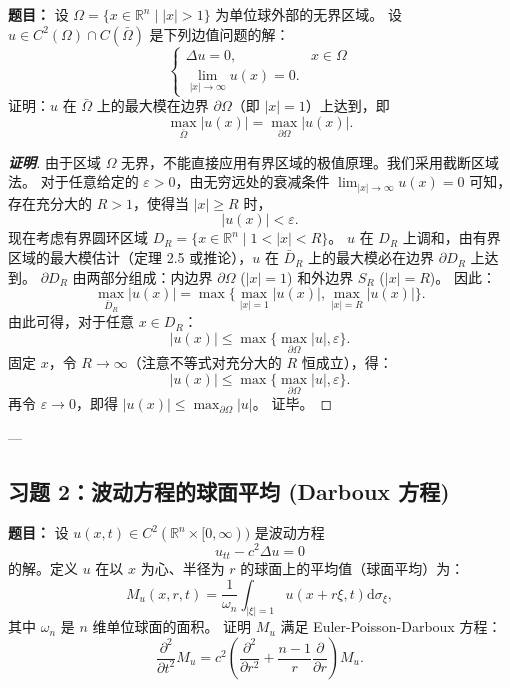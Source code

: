 \documentclass[12pt,a4paper]{ctexart}
\begin{document}
	\textbf{题目：}
	设 $\Omega = \{ x \in \mathbb{R}^n \mid |x| > 1 \}$ 为单位球外部的无界区域。
	设 $u \in C^2(\Omega) \cap C(\bar{\Omega})$ 是下列边值问题的解：
	\begin{equation}
		\begin{cases}
			\Delta u = 0, & x \in \Omega \\
			\lim_{|x| \to \infty} u(x) = 0. &
		\end{cases}
	\end{equation}
	证明：$u$ 在 $\bar{\Omega}$ 上的最大模在边界 $\partial \Omega$（即 $|x|=1$）上达到，即
	\begin{equation}
		\max_{\bar{\Omega}} |u(x)| = \max_{\partial \Omega} |u(x)|.
	\end{equation}
	
	\begin{proof}[\textbf{证明}]
		由于区域 $\Omega$ 无界，不能直接应用有界区域的极值原理。我们采用截断区域法。
		对于任意给定的 $\varepsilon > 0$，由无穷远处的衰减条件 $\lim_{|x| \to \infty} u(x) = 0$ 可知，存在充分大的 $R > 1$，使得当 $|x| \ge R$ 时，
		\[
		|u(x)| < \varepsilon.
		\]
		现在考虑有界圆环区域 $D_R = \{ x \in \mathbb{R}^n \mid 1 < |x| < R \}$。
		$u$ 在 $D_R$ 上调和，由有界区域的最大模估计（定理 2.5 或推论），$u$ 在 $\bar{D}_R$ 上的最大模必在边界 $\partial D_R$ 上达到。
		$\partial D_R$ 由两部分组成：内边界 $\partial \Omega$ ($|x|=1$) 和外边界 $S_R$ ($|x|=R$)。
		因此：
		\[
		\max_{\bar{D}_R} |u(x)| = \max \{ \max_{|x|=1} |u(x)|, \max_{|x|=R} |u(x)| \}.
		\]
		由此可得，对于任意 $x \in D_R$：
		\[
		|u(x)| \le \max \{ \max_{\partial \Omega} |u|, \varepsilon \}.
		\]
		固定 $x$，令 $R \to \infty$（注意不等式对充分大的 $R$ 恒成立），得：
		\[
		|u(x)| \le \max \{ \max_{\partial \Omega} |u|, \varepsilon \}.
		\]
		再令 $\varepsilon \to 0$，即得 $|u(x)| \le \max_{\partial \Omega} |u|$。
		证毕。
	\end{proof}
	
	---
	
	\subsection*{习题 2：波动方程的球面平均 (Darboux 方程)}
	
	\textbf{题目：}
	设 $u(x,t) \in C^2(\mathbb{R}^n \times [0, \infty))$ 是波动方程
	\[
	u_{tt} - c^2 \Delta u = 0
	\]
	的解。定义 $u$ 在以 $x$ 为心、半径为 $r$ 的球面上的平均值（球面平均）为：
	\begin{equation}
		M_u(x, r, t) = \frac{1}{\omega_n} \int_{|\xi|=1} u(x + r\xi, t) \mathrm{d}\sigma_\xi,
	\end{equation}
	其中 $\omega_n$ 是 $n$ 维单位球面的面积。
	证明 $M_u$ 满足 Euler-Poisson-Darboux 方程：
	\begin{equation}
		\frac{\partial^2}{\partial t^2} M_u = c^2 \left( \frac{\partial^2}{\partial r^2} + \frac{n-1}{r} \frac{\partial}{\partial r} \right) M_u.
	\end{equation}
	
\end{document}
